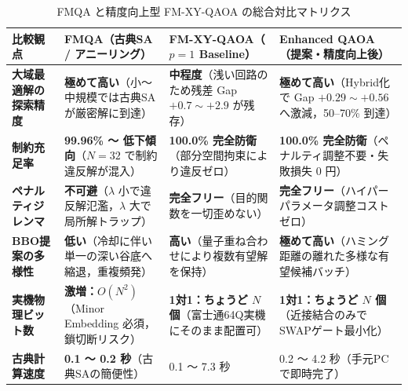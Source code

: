 \documentclass[11pt,a4paper]{ltjsarticle}
\begin{document}
\begin{table}[H]
\centering
\caption{FMQA と精度向上型 FM-XY-QAOA の総合対比マトリクス}\label{tab:fmqa_vs_enhanced_qaoa}
\vspace{1mm}
\footnotesize
\setlength{\tabcolsep}{3.5pt}
\renewcommand{\arraystretch}{1.25}
\begin{tabularx}{\textwidth}{l X X X}
\toprule
\textbf{比較観点} & \textbf{FMQA（古典SA / アニーリング）} & \textbf{FM-XY-QAOA（$p=1$ Baseline）} & \textbf{Enhanced QAOA（提案・精度向上後）} \\
\midrule
\textbf{大域最適解の探索精度} & \textbf{極めて高い}（小〜中規模では古典SAが厳密解に到達） & \textbf{中程度}（浅い回路のため残差 Gap $+0.7 \sim +2.9$ が残存） & \textbf{極めて高い}（Hybrid化で Gap $+0.29 \sim +0.56$ へ激減，50--70\% 到達） \\
\textbf{制約充足率} & \textbf{99.96\% 〜 低下傾向}（$N=32$ で制約違反解が混入） & \textbf{100.0\% 完全防衛}（部分空間拘束により違反ゼロ） & \textbf{100.0\% 完全防衛}（ペナルティ調整不要・失敗損失 0 円） \\
\textbf{ペナルティジレンマ} & \textbf{不可避}（$\lambda$ 小で違反解氾濫，$\lambda$ 大で局所解トラップ） & \textbf{完全フリー}（目的関数を一切歪めない） & \textbf{完全フリー}（ハイパーパラメータ調整コストゼロ） \\
\textbf{BBO提案の多様性} & \textbf{低い}（冷却に伴い単一の深い谷底へ縮退，重複頻発） & \textbf{高い}（量子重ね合わせにより複数有望解を保持） & \textbf{極めて高い}（ハミング距離の離れた多様な有望候補バッチ） \\
\textbf{実機物理ビット数} & \textbf{激増：$O(N^2)$}（Minor Embedding 必須，鎖切断リスク） & \textbf{1対1：ちょうど $N$ 個}（富士通64Q実機にそのまま配置可） & \textbf{1対1：ちょうど $N$ 個}（近接結合のみでSWAPゲート最小化） \\
\textbf{古典計算速度} & \textbf{0.1 〜 0.2 秒}（古典SAの簡便性） & 0.1 〜 7.3 秒 & 0.2 〜 4.2 秒（手元PCで即時完了） \\
\bottomrule
\end{tabularx}
\end{table}

\vspace{-1mm}
\end{document}
